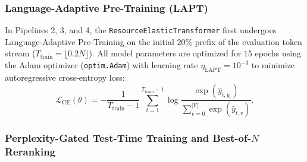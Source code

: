 \documentclass{interact}
\begin{document}
\subsubsection{Language-Adaptive Pre-Training (LAPT)}

In Pipelines 2, 3, and 4, the \texttt{ResourceElasticTransformer} first undergoes Language-Adaptive Pre-Training on the initial $20\%$ prefix of the evaluation token stream ($T_{\text{train}} = \lfloor 0.2 N \rfloor$). All model parameters are optimized for $15$ epochs using the Adam optimizer (\texttt{optim.Adam}) with learning rate $\eta_{\text{LAPT}} = 10^{-3}$ to minimize autoregressive cross-entropy loss:
\begin{equation}
    \mathcal{L}_{\text{CE}}(\theta) = -\frac{1}{T_{\text{train}}-1} \sum_{t=1}^{T_{\text{train}}-1} \log \frac{\exp(\hat{y}_{t, y_t})}{\sum_{v=0}^{|V|} \exp(\hat{y}_{t, v})}.
    \label{eq:lapt_loss}
\end{equation}

\subsubsection{Perplexity-Gated Test-Time Training and Best-of-\texorpdfstring{$N$}{N} Reranking}
\end{document}
